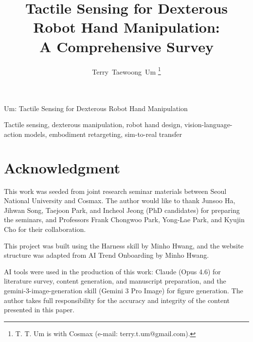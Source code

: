 \documentclass[journal]{IEEEtran}
\begin{document}
\title{Tactile Sensing for Dexterous Robot Hand Manipulation:\\A Comprehensive Survey}

\author{Terry~Taewoong~Um
\thanks{T. T. Um is with Cosmax (e-mail: terry.t.um@gmail.com).}}

%
{Um: Tactile Sensing for Dexterous Robot Hand Manipulation}

\maketitle



\begin{IEEEkeywords}
Tactile sensing, dexterous manipulation, robot hand design, vision-language-action models, embodiment retargeting, sim-to-real transfer
\end{IEEEkeywords}












\section*{Acknowledgment}
This work was seeded from joint research seminar materials between Seoul National University and Cosmax. The author would like to thank Junsoo Ha, Jihwan Song, Taejoon Park, and Incheol Jeong (PhD candidates) for preparing the seminars, and Professors Frank Chongwoo Park, Yong-Lae Park, and Kyujin Cho for their collaboration.

This project was built using the Harness skill by Minho Hwang, and the website structure was adapted from AI Trend Onboarding by Minho Hwang.

AI tools were used in the production of this work: Claude (Opus 4.6) for literature survey, content generation, and manuscript preparation, and the gemini-3-image-generation skill (Gemini 3 Pro Image) for figure generation. The author takes full responsibility for the accuracy and integrity of the content presented in this paper.



\end{document}
